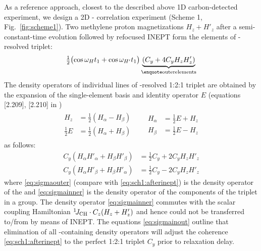 \documentclass[twocolumn]{svjour3}           %
\begin{document}
As a reference approach, closest to the described above 1D carbon-detected 
experiment, we design a 2D \hlab-\clab{} correlation experiment
(Scheme 1, Fig.~\ref{fig:scheme1}). Two methylene proton magnetizations $H_z+H'_z$ after a semi-constant-time \hlab{} evolution followed by refocused {INEPT} form the \qouter{} elements of \oneJch-resolved triplet:
\begin{align}
  \label{eq:sch1:afterinept}
  \tfrac{1}{2}\bigl(\cos \omega_H t_1+\cos \omega_{H'} t_1\bigr) 
   \underbrace{(C_y+4 C_y H_z H'_z)}_\text{\qouter elements}
\end{align}
The density operators of individual lines of 
\oneJch-resolved 1:2:1 \clab{} tri\-plet 
are obtained by the expansion of the single-element basis
and identity operator $E$ (equations [2.209], [2.210] 
in \cite{cavanagh_protein_2007})
\begin{align}
  \begin{aligned}
    H_z & = \tfrac{1}{2}(H_\alpha-H_\beta) \\
    \tfrac{1}{2}E &= \tfrac{1}{2}(H_\alpha+H_\beta) 
  \end{aligned}
  &&
  \begin{aligned}
     H_\alpha & = \tfrac{1}{2}E+H_z \\
     H_\beta & = \tfrac{1}{2}E-H_z
\end{aligned}
\end{align}
as follows:
\begin{subequations}
\label{eq:sigmainout}
\begin{align}
  \label{eq:sigmaouter}
  C_y (H_\alpha H'_\alpha + H_\beta H'_\beta) & = \tfrac{1}{2}C_y+2C_y H_z H'_z \\
  \label{eq:sigmainner}
  C_y (H_\alpha H'_\beta + H_\beta H'_\alpha) & = \tfrac{1}{2}C_y-2C_y H_z H'_z
\end{align}
\end{subequations}
where \eqref{eq:sigmaouter} (compare with \eqref{eq:sch1:afterinept}) is 
the density operator of the \qouter{} and \eqref{eq:sigmainner} is 
the density operator of the \qinner{} 
components of the \clab{} triplet in a \CHtwo{} group. The density operator 
\eqref{eq:sigmainner} commutes with the scalar coupling Hamiltonian 
$^1\!J_\text{CH} \cdot C_z(H_z+H'_z)$
and hence could not be transferred to/from \hlab{} by means of INEPT. 
The equations \eqref{eq:sigmainout} outline that elimination of all \hlab-containing
density operators will adjust the coherence \eqref{eq:sch1:afterinept}
to the perfect 1:2:1 triplet $C_y$ 
\cite{yang_study_1998,banci_side_2001,zheng_measurement_2004} 
prior to relaxation delay. 
\end{document}
